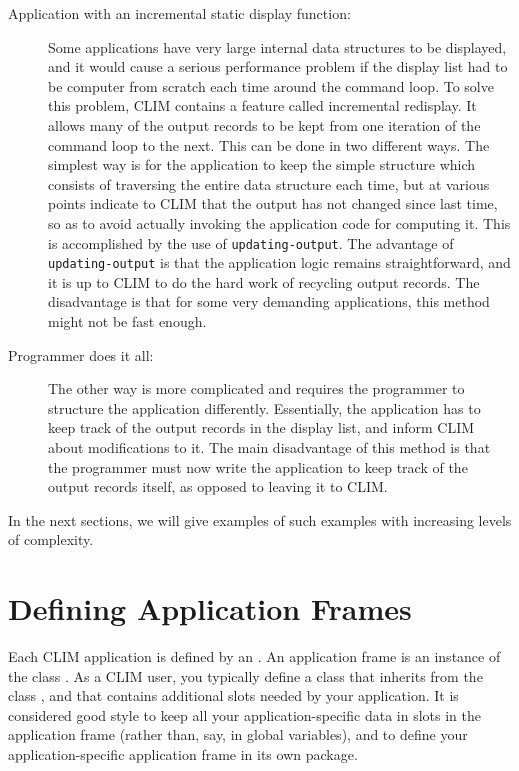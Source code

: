 \begin{description}
  \item[Application with an incremental static display function:] Some
    applications have very large internal data structures to be
    displayed, and it would cause a serious performance problem if the
    display list had to be computer from scratch each time around the
    command loop.  To solve this problem, CLIM contains a feature
    called incremental redisplay.  It allows many of the output
    records to be kept from one iteration of the command loop to the
    next.  This can be done in two different ways.  The simplest way
    is for the application to keep the simple structure which consists
    of traversing the entire data structure each time, but at various
    points indicate to CLIM that the output has not changed since last
    time, so as to avoid actually invoking the application code for
    computing it.  This is accomplished by the use of
    \texttt{updating-output}.  The advantage of
    \texttt{updating-output} is that the application logic remains
    straightforward, and it is up to CLIM to do the hard work of
    recycling output records.  The disadvantage is that for some very
    demanding applications, this method might not be fast enough.

  \item[Programmer does it all:] The other way is more complicated and
    requires the programmer to structure the application differently.
    Essentially, the application has to keep track of the output
    records in the display list, and inform CLIM about modifications
    to it.  The main disadvantage of this method is that the
    programmer must now write the application to keep track of the
    output records itself, as opposed to leaving it to CLIM.

\end{description}

In the next sections, we will give examples of such examples with
increasing levels of complexity.


\section{Defining Application Frames}

Each CLIM application is defined by an .  An
application frame is an instance of the class
.  As a CLIM user, you typically define a
class that inherits from the class , and that
contains additional slots needed by your application.  It is
considered good style to keep all your application-specific data in
slots in the application frame (rather than, say, in global
variables), and to define your application-specific application frame
in its own package.


